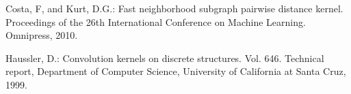 \documentclass[runningheads,a4paper]{llncs}
\begin{document}
\begin{thebibliography}{4}
 Costa, F, and Kurt, D.G.: Fast neighborhood subgraph pairwise distance kernel. Proceedings of the 26th International Conference on Machine Learning. Omnipress, 2010.

 Haussler, D.: Convolution kernels on discrete structures. Vol. 646. Technical report, Department of Computer Science, University of California at Santa Cruz, 1999.

%
%
%
%
%

\end{thebibliography}
\end{document}
